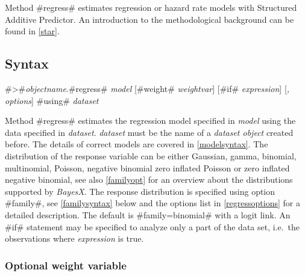 Method #regress# estimates regression or hazard rate models with
Structured Additive Predictor. An introduction to the
methodological background can be found in \autoref{star}.

     



\subsection{Syntax}
\label{bayesregregresssyntax}

 #>#{\em objectname}.#regress# {\em model} [#weight# {\em weightvar}] [#if# {\em expression}] [{\em , options}] #using# {\em dataset}

Method #regress# estimates the regression model specified in {\em
model} using the data specified in {\em dataset}. {\em dataset}
must be the name of a {\em dataset object} created before. The
details of correct models are covered in \autoref{modelsyntax}.
The distribution of the response variable can be either Gaussian,
gamma, binomial, multinomial, Poisson, negative binomial
zero inflated Poisson or zero inflated negative binomial, see
also \autoref{familyopt} for an overview about the distributions
supported by {\em BayesX}. The response distribution is specified
using option #family#, see \autoref{familysyntax} below and the
options list in \autoref{regressoptions} for a detailed
description. The default is #family=binomial# with a logit link.
An #if# statement may be specified to analyze only a part of the
data set, i.e.~the observations where {\em expression} is true.

\subsubsection{Optional weight variable }
\label{weightspecification}

